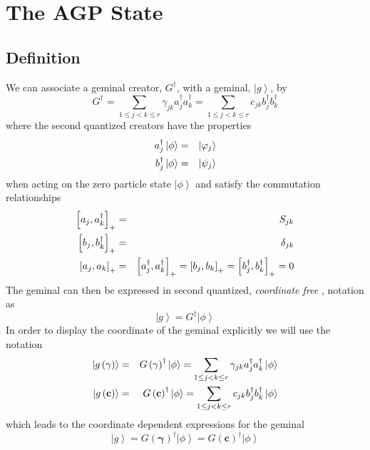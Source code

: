 \documentclass{article}
\begin{document}
\section{The AGP State}

\subsection{Definition}

We can associate a geminal creator, $G^{\dagger }$, with a geminal, $\left|
g\right\rangle $, by 
\begin{equation}
G^{\dagger }=\sum_{1\leq j<k\leq r}\gamma _{jk}a_{j}^{\dagger
}a_{k}^{\dagger }=\sum_{1\leq j<k\leq r}c_{jk}b_{j}^{\dagger }b_{k}^{\dagger
}
\end{equation}%
where the second quantized creators have the properties 
\begin{eqnarray}
a_{j}^{\dagger }\left| \phi \right\rangle &=&\left| \varphi _{j}\right\rangle
\notag \\
b_{j}^{\dagger }\left| \phi \right\rangle &=&\left| \psi _{j}\right\rangle
\end{eqnarray}%
when acting on the zero particle state $\left| \phi \right\rangle $ and
satisfy the commutation relationships 
\begin{eqnarray}
\left[ a_{j},a_{k}^{\dagger }\right] _{+} &=&S_{jk}  \notag \\
\left[ b_{j},b_{k}^{\dagger }\right] _{+} &=&\delta _{jk}  \notag \\
\left[ a_{j},a_{k}\right] _{+} &=&\left[ a_{j}^{\dagger },a_{k}^{\dagger }%
\right] _{+}=\left[ b_{j},b_{k}\right] _{+}=\left[ b_{j}^{\dagger
},b_{k}^{\dagger }\right] _{+}=0
\end{eqnarray}%
The geminal can then be expressed in second quantized, \emph{coordinate free}%
, notation as 
\begin{equation}
\left| g\right\rangle =G^{\dagger }\left| \phi \right\rangle
\end{equation}%
\qquad In order to display the coordinate of the geminal explicitly we will
use the notation 
\begin{eqnarray}
\left| g\left( \mathbf{\gamma }\right) \right\rangle &=&G\left( \mathbf{%
\gamma }\right) ^{\dagger }\left| \phi \right\rangle =\sum_{1\leq j<k\leq
r}\gamma _{jk}a_{j}^{\dagger }a_{k}^{\dagger }\left| \phi \right\rangle 
\notag \\
\left| g\left( \mathbf{c}\right) \right\rangle &=&G\left( \mathbf{c}\right)
^{\dagger }\left| \phi \right\rangle =\sum_{1\leq j<k\leq
r}c_{jk}b_{j}^{\dagger }b_{k}^{\dagger }\left| \phi \right\rangle
\label{quantgem}
\end{eqnarray}%
which leads to the coordinate dependent expressions for the geminal 
\begin{equation}
\left| g\right\rangle =G\left( \mathbf{\gamma }\right) ^{\dagger }\left|
\phi \right\rangle =G\left( \mathbf{c}\right) ^{\dagger }\left| \phi
\right\rangle
\end{equation}
\end{document}
